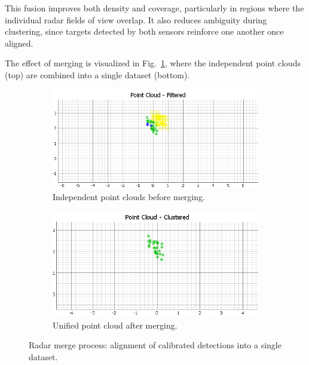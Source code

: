 This fusion improves both density and coverage, particularly in regions where the individual radar fields of view overlap.  
It also reduces ambiguity during clustering, since targets detected by both sensors reinforce one another once aligned.  

The effect of merging is visualized in Fig.~\ref{fig:radar_merge}, where the independent point clouds (top) are combined into a single dataset (bottom).  

\begin{figure}[!htbp]
    \centering
    \begin{subfigure}[t]{0.8\linewidth}
        \centering
        \includegraphics[width=\linewidth]{images/AFTERdualSensorCalib_2mts.png}
        \caption{Independent point clouds before merging.}
    \end{subfigure}
    \vfill
    \begin{subfigure}[t]{0.8\linewidth}
        \centering
        \includegraphics[width=\linewidth]{images/AFTERdualSensorCalibCluster_2mts.png}
        \caption{Unified point cloud after merging.}
    \end{subfigure}
    \caption{Radar merge process: alignment of calibrated detections into a single dataset.}
    \label{fig:radar_merge}
\end{figure}


